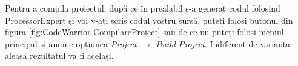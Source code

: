Pentru a compila proiectul, după ce în prealabil s-a generat codul folosind ProcessorExpert și voi v-ați scris codul vostru sursă, puteti folosi butonul din figura \ref{fig:CodeWarrior-CompilareProiect} sau de ce nu puteți folosi meniul principal și anume opțiunea \textit{Project $\rightarrow$ Build Project}. Indiferent de varianta aleasă rezultatul va fi același.